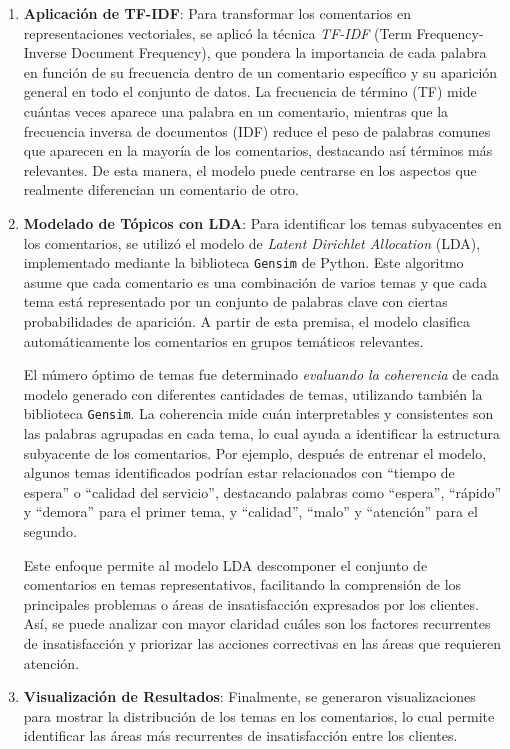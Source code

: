 \documentclass{matematicasud}
\begin{document}
\begin{enumerate}
    \item \textbf{Aplicación de TF-IDF}: Para transformar los comentarios en representaciones vectoriales, se aplicó la técnica \textit{TF-IDF} (Term Frequency-Inverse Document Frequency), que pondera la importancia de cada palabra en función de su frecuencia dentro de un comentario específico y su aparición general en todo el conjunto de datos. La frecuencia de término (TF) mide cuántas veces aparece una palabra en un comentario, mientras que la frecuencia inversa de documentos (IDF) reduce el peso de palabras comunes que aparecen en la mayoría de los comentarios, destacando así términos más relevantes. De esta manera, el modelo puede centrarse en los aspectos que realmente diferencian un comentario de otro.

    \item \textbf{Modelado de Tópicos con LDA}: Para identificar los temas subyacentes en los comentarios, se utilizó el modelo de \textit{Latent Dirichlet Allocation} (LDA), implementado mediante la biblioteca \texttt{Gensim} de Python. Este algoritmo asume que cada comentario es una combinación de varios temas y que cada tema está representado por un conjunto de palabras clave con ciertas probabilidades de aparición. A partir de esta premisa, el modelo clasifica automáticamente los comentarios en grupos temáticos relevantes.

    El número óptimo de temas fue determinado \textit{evaluando la coherencia} de cada modelo generado con diferentes cantidades de temas, utilizando también la biblioteca \texttt{Gensim}. La coherencia mide cuán interpretables y consistentes son las palabras agrupadas en cada tema, lo cual ayuda a identificar la estructura subyacente de los comentarios. Por ejemplo, después de entrenar el modelo, algunos temas identificados podrían estar relacionados con ``tiempo de espera'' o ``calidad del servicio'', destacando palabras como ``espera'', ``rápido'' y ``demora'' para el primer tema, y ``calidad'', ``malo'' y ``atención'' para el segundo.

    Este enfoque permite al modelo LDA descomponer el conjunto de comentarios en temas representativos, facilitando la comprensión de los principales problemas o áreas de insatisfacción expresados por los clientes. Así, se puede analizar con mayor claridad cuáles son los factores recurrentes de insatisfacción y priorizar las acciones correctivas en las áreas que requieren atención.

    \item \textbf{Visualización de Resultados}: Finalmente, se generaron visualizaciones para mostrar la distribución de los temas en los comentarios, lo cual permite identificar las áreas más recurrentes de insatisfacción entre los clientes.
\end{enumerate}
\end{document}
